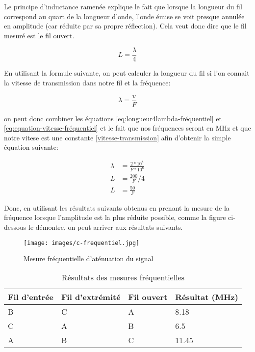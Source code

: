 Le principe d'inductance ramenée explique le fait que lorsque la longueur du fil correspond au quart de la longueur d'onde, l'onde émise se voit
presque annulée en amplitude (car réduite par sa propre réflection). Cela veut donc dire que le fil mesuré est le fil ouvert.

\begin{equation}
    L = \frac{\lambda}{4}
    \label{eq:longueur4lambda-fréquentiel}
\end{equation}

 En utilisant la formule suivante, on peut calculer la longueur du fil si l'on connait la vitesse de transmission dans notre fil et la fréquence:

\begin{equation}
\lambda = \frac{v}{F} \label{eq:equation-vitesse-fréquentiel}
\end{equation}

 on peut donc combiner les équations \ref{eq:longueur4lambda-fréquentiel} et \ref{eq:equation-vitesse-fréquentiel} et le fait que nos fréquences
 seront en MHz et que notre vitese est une constante \ref{vitesse-transmission} afin d'obtenir la simple équation suivante:

 \begin{equation}
    \begin{aligned}
        \lambda & = \frac{2*10^8}{F*10^6} \\
        L & = \frac{200}{F} / 4 \\
        L & = \frac{50}{F}
        \label{eq:equation-longueur-simple}
    \end{aligned}
 \end{equation}

 Donc, en utilisant les résultats suivants obtenus en prenant la mesure de la fréquence lorsque l'amplitude est la plus réduite possible, comme
 la figure ci-dessous le démontre, on peut arriver aux résultats suivants.

\begin{figure}[H]
   \centering
   \texttt{[image: images/c-frequentiel.jpg]}
   \caption{Mesure fréquentielle d'aténuation du signal}
   \label{fig:mesure-frequentiel}
\end{figure}


\begin{center}
\begin{table}[H]
\caption{Résultats des mesures fréquentielles} \label{tab:tableau mesures fréquentiel}
\begin{tabularx}{\textwidth}{ X X X X }
   Fil d'entrée & Fil d'extrémité & Fil ouvert & Résultat (MHz) \\
   \hline
   \hline
    B & C & A & 8.18\\
    C & A & B & 6.5\\
    A & B & C & 11.45\\
    \hline
\end{tabularx}
\end{table}
\end{center}

